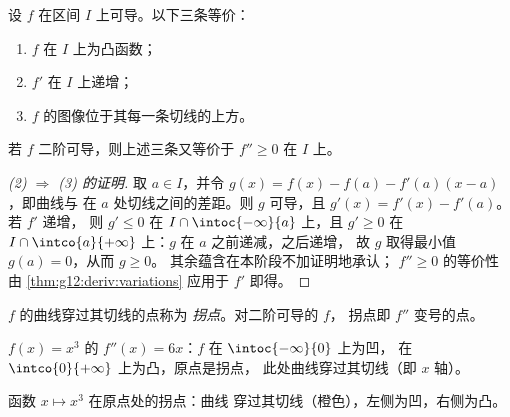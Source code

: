 \begin{theorem}[凸性与导数]\label{thm:g12:deriv:convexity}
设 $f$ 在区间 $I$ 上可导。以下三条等价：
\begin{enumerate}
  \item $f$ 在 $I$ 上为凸函数；
  \item $f'$ 在 $I$ 上递增；
  \item $f$ 的图像位于其每一条切线的上方。
\end{enumerate}
若 $f$ 二阶可导，则上述三条又等价于
$f'' \geq 0$ 在 $I$ 上。
\end{theorem}

\begin{proof}[(2) $\Rightarrow$ (3) 的证明]
取 $a \in I$，并令
$g(x) = f(x) - f(a) - f'(a)(x-a)$，即曲线与
在 $a$ 处切线之间的差距。则 $g$ 可导，且 $g'(x) = f'(x) - f'(a)$。若 $f'$ 递增，
则 $g' \leq 0$ 在 $I \cap \intoc{-\infty}{a}$ 上，且 $g' \geq 0$ 在
$I \cap \intco{a}{+\infty}$ 上：$g$ 在 $a$ 之前递减，之后递增，
故 $g$ 取得最小值 $g(a) = 0$，从而 $g \geq 0$。
其余蕴含在本阶段不加证明地承认；
$f'' \geq 0$ 的等价性由 \cref{thm:g12:deriv:variations} 应用于 $f'$ 即得。
\end{proof}

\begin{definition}[拐点]\label{def:g12:deriv:inflection}
$f$ 的曲线穿过其切线的点称为
\emph{拐点}。对二阶可导的 $f$，
拐点即 $f''$ 变号的点。
\end{definition}

\begin{example}\label{ex:g12:deriv:cube}
$f(x) = x^3$ 的 $f''(x) = 6x$：$f$ 在 $\intoc{-\infty}{0}$ 上为凹，
在 $\intco{0}{+\infty}$ 上为凸，原点是拐点，
此处曲线穿过其切线（即 $x$ 轴）。
\end{example}

\begin{omfigure}

{\small 函数 $x \mapsto x^3$ 在原点处的拐点：曲线
穿过其切线（橙色），左侧为凹，右侧为凸。}
\end{omfigure}

